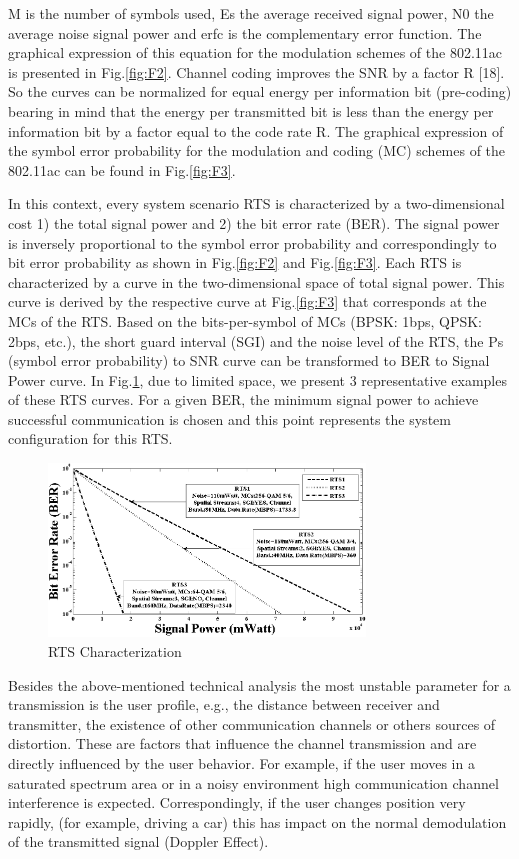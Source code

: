 M is the number of symbols used, Es the average received signal power, N0 the average noise signal power and erfc is the complementary error function.
	The graphical expression of this equation for the modulation schemes of the 802.11ac is presented in Fig.\ref{fig:F2}. Channel coding improves the SNR by a factor R [18]. So the curves can be normalized for equal energy per information bit (pre-coding) bearing in mind that the energy per transmitted bit is less than the energy per information bit by a factor equal to the code rate R. The graphical expression of the symbol error probability for the modulation and coding (MC) schemes of the 802.11ac can be found in Fig.\ref{fig:F3}.
	
	In this context, every system scenario RTS is characterized by a two-dimensional cost 1) the total signal power and 2) the bit error rate (BER). The signal power is inversely proportional to the symbol error probability and correspondingly to bit error probability as shown in Fig.\ref{fig:F2} and Fig.\ref{fig:F3}. Each RTS is characterized by a curve in the two-dimensional space of total signal power. This curve is derived by the respective curve at Fig.\ref{fig:F3} that corresponds at the MCs of the RTS. Based on the bits-per-symbol of MCs (BPSK: 1bps, QPSK: 2bps, etc.), the short guard interval (SGI) and the noise level of the RTS, the Ps (symbol error probability) to SNR curve can be transformed to BER to Signal Power curve. In Fig.\ref{fig:F4}, due to limited space, we present 3 representative examples of these RTS curves. For a given BER, the minimum signal power to achieve successful communication is chosen and this point represents the system configuration for this RTS. 
	
\begin{figure}
\centering
\includegraphics[width=0.75\textwidth]{F/image8.png}
\caption{RTS Characterization}
\label{fig:F4}
\end{figure}	
	
	Besides the above-mentioned technical analysis the most unstable parameter for a transmission is the user profile, e.g., the distance between receiver and transmitter, the existence of other communication channels or others sources of distortion. These are factors that influence the channel transmission and are directly influenced by the user behavior. For example, if the user moves in a saturated spectrum area or in a noisy environment high communication channel interference is expected. Correspondingly, if the user changes position very rapidly, (for example, driving a car) this has impact on the normal demodulation of the transmitted signal (Doppler Effect). 
	
